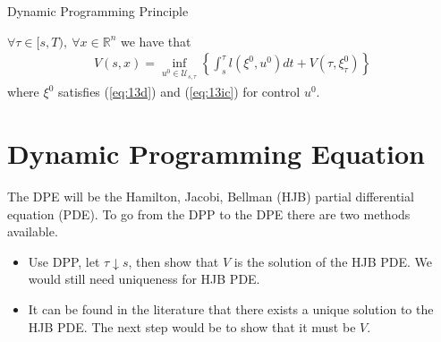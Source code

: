 \begin{theorem}{Dynamic Programming Principle}

$\forall \tau\in[s,T),~\forall x\in\mathbb{R}^n$ we have that%
\begin{align}
\label{eq:13dpp}
V(s,x) = \inf_{u^0\in\mathcal{U}_{s,\tau}} \left\lbrace \int_s^\tau l(\xi^0,u^0)dt + V(\tau,\xi_\tau^0) \right\rbrace
\end{align}
where $\xi^0$ satisfies (\ref{eq:13d}) and (\ref{eq:13ic}) for control $u^0$.
\end{theorem}

\section{Dynamic Programming Equation}
The DPE will be the Hamilton, Jacobi, Bellman (HJB) partial differential equation (PDE).
To go from the DPP to the DPE there are two methods available.
\begin{itemize}
\item Use DPP, let $\tau\downarrow s$, then show that $V$ is the solution of the HJB PDE\@.
      We would still need uniqueness for HJB PDE\@.
\item It can be found in the literature that there exists a unique solution to the HJB PDE\@.
      The next step would be to show that it must be $V$.
\end{itemize}


